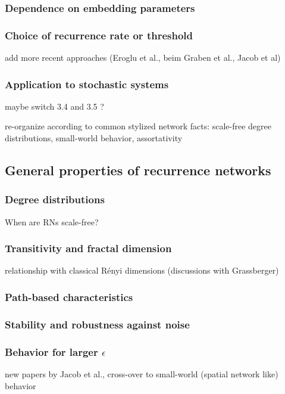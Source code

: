 		\subsubsection{Dependence on embedding parameters}
		\subsubsection{Choice of recurrence rate or threshold}
        
        add more recent approaches (Eroglu et al., beim Graben et al., Jacob et al)
        
		\subsubsection{Application to stochastic systems}

maybe switch 3.4 and 3.5 ?

re-organize according to common stylized network facts: scale-free degree
distributions, small-world behavior, assortativity 

	\subsection{General properties of recurrence networks}
		
        \subsubsection{Degree distributions} 
        When are RNs scale-free?
		
        \subsubsection{Transitivity and fractal dimension}
        relationship with classical R\'enyi dimensions (discussions with Grassberger)
        
		\subsubsection{Path-based characteristics}
		
        \subsubsection{Stability and robustness against noise}
        
        \subsubsection{Behavior for larger $\epsilon$}
        new papers by Jacob et al., cross-over to small-world (spatial network like) behavior

